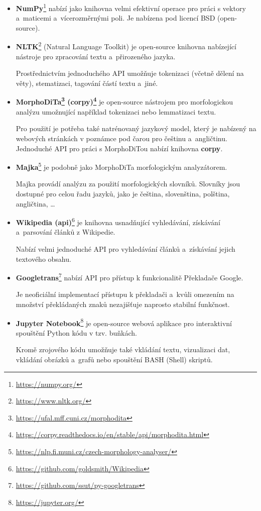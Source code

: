 \begin{itemize}
    \item \textbf{NumPy}\footnote{\url{https://numpy.org/}}
    nabízí jako knihovna velmi efektivní operace pro práci s vektory a~maticemi a~vícerozměrnými poli. Je nabízena pod licencí BSD (open-source).
    
    \item \textbf{NLTK}\footnote{\url{https://www.nltk.org/}}
    (Natural Language Toolkit) je open-source knihovna nabízející nástroje pro zpracování textu a~přirozeného jazyka.\par Prostřednictvím jednoduchého API umožňuje tokenizaci (včetně dělení na věty), stematizaci, tagování částí textu a~jiné. 
    
    \item \textbf{MorphoDiTa\footnote{\url{https://ufal.mff.cuni.cz/morphodita}} (corpy)\footnote{\url{https://corpy.readthedocs.io/en/stable/api/morphodita.html}}}
    je open-source nástrojem pro morfologickou analýzu umožnující například tokenizaci nebo lemmatizaci textu.\par
    Pro použití je potřeba také natrénovaný jazykový model, který je nabízený na webových stránkách v poznámce pod čarou pro češtinu a~angličtinu. Jednoduché API pro práci s MorphoDiTou nabízí knihovna \textbf{corpy}.
    
    \item \textbf{Majka}\footnote{\url{https://nlp.fi.muni.cz/czech-morphology-analyser/}}
    je podobně jako MorphoDiTa morfologickým analyzátorem.\par Majka provádí analýzu za použití morfologických slovníků. Slovníky jsou dostupné pro celou řadu jazyků, jako je čeština, slovenština, polština, angličtina, \dots
    
    \item \textbf{Wikipedia (api)}\footnote{\url{https://github.com/goldsmith/Wikipedia}}
    je knihovna usnadňující vyhledávání, získávání a~parsování článků z Wikipedie. \par Nabízí velmi jednoduché API pro vyhledávání článků a~získávání jejich textového obsahu.
    
    \item \textbf{Googletrans}\footnote{\url{https://github.com/ssut/py-googletrans}}
    nabízí API pro přístup k funkcionalitě Překladače Google. \par
    Je neoficiální implementací přístupu k překladači a~kvůli omezením na množství překládaných znaků nezajišťuje naprosto stabilní funkčnost.
    
    \item \textbf{Jupyter Notebook}\footnote{\url{https://jupyter.org/}} 
    je open-source webová aplikace pro interaktivní spouštění Python kódu v tzv. buňkách.\par
    Kromě zrojového kódu umožňuje také vkládání textu, vizualizaci dat, vkládání obrázků a~grafů nebo spouštění BASH (Shell) skriptů.
    

\end{itemize}
